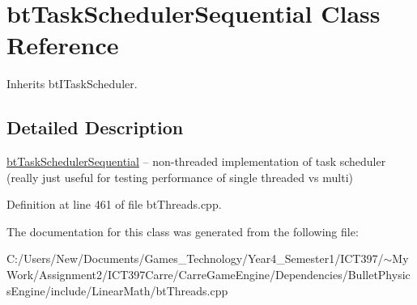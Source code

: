 \hypertarget{classbt_task_scheduler_sequential}{
\section{btTaskSchedulerSequential Class Reference}
\label{classbt_task_scheduler_sequential}
}
Inherits btITaskScheduler.



\subsection{Detailed Description}
\hyperlink{classbt_task_scheduler_sequential}{btTaskSchedulerSequential} -- non-threaded implementation of task scheduler (really just useful for testing performance of single threaded vs multi) 

Definition at line 461 of file btThreads.cpp.

The documentation for this class was generated from the following file:\begin{CompactItemize}
\item 
C:/Users/New/Documents/Games\_\-Technology/Year4\_\-Semester1/ICT397/$\sim$My Work/Assignment2/ICT397Carre/CarreGameEngine/Dependencies/BulletPhysicsEngine/include/LinearMath/btThreads.cpp\end{CompactItemize}
